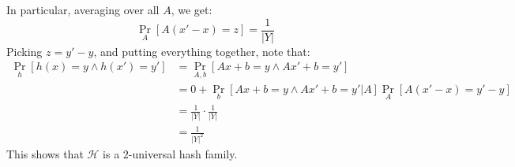 \documentclass[12pt]{article}
\begin{document}
\begin{solution}
    In particular, averaging over all $A$, we get:
    \[ \Pr_A[A(x'-x) = z] = \frac{1}{|Y|}\]
    Picking $z = y'-y$, and putting everything together, note that: 
    \begin{align*}
        \Pr_h[h(x) = y \land h(x') = y'] &= \Pr_{A,b}[Ax+b = y \land Ax'+b = y'] \\
        &= 0 + \Pr_{b}[Ax+b = y \land Ax'+b = y' | A]\Pr_A[A(x'-x) = y'-y] \\
        &= \frac{1}{|Y|} \cdot \frac{1}{|Y|} \\
        &= \frac{1}{|Y|^2} 
    \end{align*}
    This shows that $\mathcal{H}$ is a $2$-universal hash family.
\end{solution}

\end{document}
